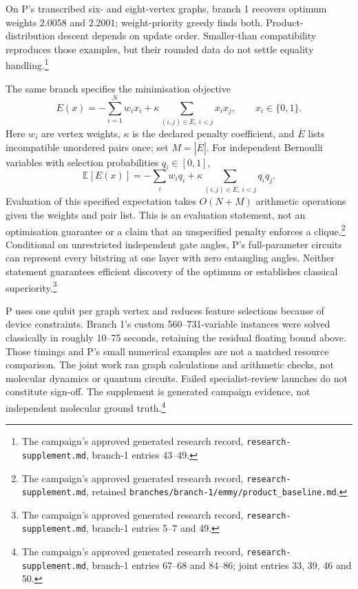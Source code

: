 \documentclass{article}
\newcommand{\rr}[1]{\footnote{The campaign's approved generated research record, \texttt{research-supplement.md}, #1.}}
\begin{document}
On P's transcribed six- and eight-vertex graphs, branch 1 recovers optimum weights \(2.0058\) and \(2.2001\); weight-priority greedy finds both. Product-distribution descent depends on update order. Smaller-than compatibility reproduces those examples, but their rounded data do not settle equality handling.\rr{branch-1 entries 43--49}

The same branch specifies the minimisation objective
\[
 E(x)=-\sum_{i=1}^N w_i x_i+\kappa\sum_{(i,j)\in\overline E,\ i<j}x_ix_j,\qquad x_i\in\{0,1\}.
\]
Here \(w_i\) are vertex weights, \(\kappa\) is the declared penalty coefficient, and \(\overline E\) lists incompatible unordered pairs once; set \(M=|\overline E|\). For independent Bernoulli variables with selection probabilities \(q_i\in[0,1]\),
\[
 \mathbb E[E(x)]=-\sum_iw_iq_i+\kappa\sum_{(i,j)\in\overline E,\ i<j}q_iq_j.
\]
Evaluation of this specified expectation takes \(O(N+M)\) arithmetic operations given the weights and pair list. This is an evaluation statement, not an optimisation guarantee or a claim that an unspecified penalty enforces a clique.\rr{retained \texttt{branches/branch-1/emmy/product\_baseline.md}} Conditional on unrestricted independent gate angles, P's full-parameter circuits can represent every bitstring at one layer with zero entangling angles. Neither statement guarantees efficient discovery of the optimum or establishes classical superiority.\cite{P}\rr{branch-1 entries 5--7 and 49}

P uses one qubit per graph vertex and reduces feature selections because of device constraints.\cite{P} Branch 1's custom 560--731-variable instances were solved classically in roughly 10--75 seconds, retaining the residual floating bound above. Those timings and P's small numerical examples are not a matched resource comparison. The joint work ran graph calculations and arithmetic checks, not molecular dynamics or quantum circuits. Failed specialist-review launches do not constitute sign-off. The supplement is generated campaign evidence, not independent molecular ground truth.\rr{branch-1 entries 67--68 and 84--86; joint entries 33, 39, 46 and 50}



\end{document}
